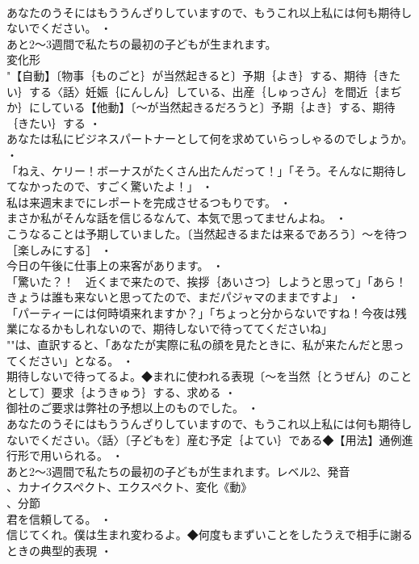 \documentclass[8pt]{extreport}
\begin{document}
\begin{CJK}{UTF8}{min}
\\	あなたのうそにはもううんざりしていますので、もうこれ以上私には何も期待しないでください。 ・
\\	あと2～3週間で私たちの最初の子どもが生まれます。
\\	変化形 
\\	"【自動】〔物事｛ものごと｝が当然起きると〕予期｛よき｝する、期待｛きたい｝する〈話〉妊娠｛にんしん｝している、出産｛しゅっさん｝を間近｛まぢか｝にしている【他動】〔～が当然起きるだろうと〕予期｛よき｝する、期待｛きたい｝する ・
\\	あなたは私にビジネスパートナーとして何を求めていらっしゃるのでしょうか。 ・
\\	「ねえ、ケリー！ボーナスがたくさん出たんだって！」「そう。そんなに期待してなかったので、すごく驚いたよ！」 ・
\\	私は来週末までにレポートを完成させるつもりです。 ・
\\	まさか私がそんな話を信じるなんて、本気で思ってませんよね。 ・
\\	こうなることは予期していました。〔当然起きるまたは来るであろう〕～を待つ［楽しみにする］ ・
\\	今日の午後に仕事上の来客があります。 ・
\\	「驚いた？！　近くまで来たので、挨拶｛あいさつ｝しようと思って」「あら！きょうは誰も来ないと思ってたので、まだパジャマのままですよ」 ・
\\	「パーティーには何時頃来れますか？」「ちょっと分からないですね！今夜は残業になるかもしれないので、期待しないで待っててくださいね」
\\	""は、直訳すると、「あなたが実際に私の顔を見たときに、私が来たんだと思ってください」となる。 ・
\\	期待しないで待ってるよ。◆まれに使われる表現〔～を当然｛とうぜん｝のこととして〕要求｛ようきゅう｝する、求める ・
\\	御社のご要求は弊社の予想以上のものでした。 ・
\\	あなたのうそにはもううんざりしていますので、もうこれ以上私には何も期待しないでください。〈話〉〔子どもを〕産む予定｛よてい｝である◆【用法】通例進行形で用いられる。 ・
\\	あと2～3週間で私たちの最初の子どもが生まれます。レベル2、発音
\\	、カナイクスペクト、エクスペクト、変化《動》
\\	、分節
\\	君を信頼してる。 ・
\\	信じてくれ。僕は生まれ変わるよ。◆何度もまずいことをしたうえで相手に謝るときの典型的表現 ・

\end{CJK}
\end{document}
